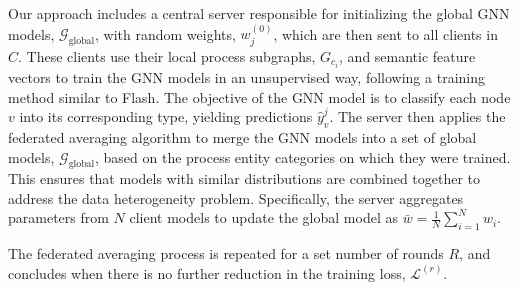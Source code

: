 Our approach includes a central server responsible for initializing the global GNN models, \(\mathcal{G}_{\text{global}}\), with random weights, \( w_j^{(0)} \), which are then sent to all clients in \( C \). These clients use their local process subgraphs, \( G_{c_i} \), and semantic feature vectors to train the GNN models in an unsupervised way, following a training method similar to Flash. The objective of the GNN model is to classify each node \( v \) into its corresponding type, yielding predictions \(\hat{y}_v^j\). The server then applies the federated averaging algorithm to merge the GNN models into a set of global models, \(\mathcal{G}_{\text{global}}\), based on the process entity categories on which they were trained. This ensures that models with similar distributions are combined together to address the data heterogeneity problem. Specifically, the server aggregates parameters from \( N \) client models to update the global model as \(\bar{w} = \frac{1}{N} \sum_{i=1}^{N} w_i\).

The federated averaging process is repeated for a set number of rounds \( R \), and concludes when there is no further reduction in the training loss, \(\mathcal{L}^{(r)}\). %


